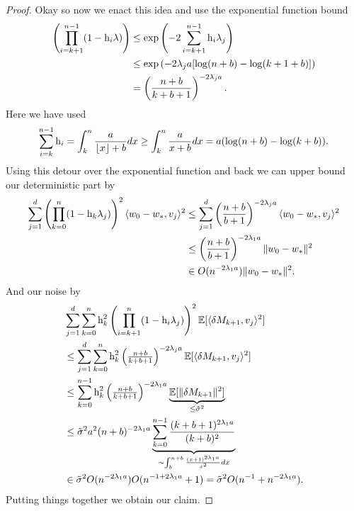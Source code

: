\begin{proof}
	Okay so now we enact this idea and use the exponential function bound
	\begin{align*}
		\left(\prod_{i=k+1}^{n-1}(1-\text{h}_i\lambda)\right)
		&\le\exp\left(-2\sum_{i=k+1}^{n-1}\text{h}_i\lambda_j\right)\\
		&\le \exp\left(-2\lambda_j a[\log(n+b)-\log(k+1+b)]\right)\\
		&= \left(\frac{n+b}{k+b+1}\right)^{-2\lambda_j a}.
	\end{align*}
	Here we have used
	\begin{align*}
		\sum_{i=k}^{n-1} \text{h}_i
		= \int_{k}^{n} \frac{a}{\lfloor x\rfloor+b} dx
		\ge \int_{k}^{n} \frac{a}{x+b} dx
		= a(\log(n+b) - \log(k+b)).
	\end{align*}
	Using this detour over the exponential function and back we can upper bound
	our deterministic part by
	\begin{align}
		\nonumber
		\sum_{j=1}^d\left(\prod_{k=0}^n(1-\text{h}_k\lambda_j)\right)^2
		\langle w_0-w_*, v_j\rangle^2
		&\le \sum_{j=1}^d \left(\frac{n+b}{b+1}\right)^{-2\lambda_j a}
		\langle w_0-w_*, v_j\rangle^2\\
		\label{eq: upper bound on convergence rate using smallest eigenvalue 1}
		&\le \left(\frac{n+b}{b+1}\right)^{-2\lambda_1 a}\|w_0-w_*\|^2\\
		\nonumber
		&\in O(n^{-2\lambda_1a})\|w_0-w_*\|^2.
	\end{align}
	And our noise by
	\begin{align}
		\nonumber
		&\sum_{j=1}^d\sum_{k=0}^n \text{h}_k^2
		\left(\prod_{i=k+1}^n(1-\text{h}_i\lambda_j)\right)^2
		\mathbb{E}[\langle\delta M_{k+1},v_j\rangle^2]\\
		\nonumber
		&\le \sum_{j=1}^d
			\sum_{k=0}^n \text{h}_k^2 \left(\tfrac{n+b}{k+b+1}\right)^{-2\lambda_j a}
			\mathbb{E}[\langle\delta M_{k+1},v_j\rangle^2]
		\\
		\label{eq: upper bound on convergence rate using smallest eigenvalue 2}
		&\le \sum_{k=0}^{n-1} \text{h}_k^2 \left(\tfrac{n+b}{k+b+1}\right)^{-2\lambda_1 a}
		\underbrace{\mathbb{E}[\|\delta M_{k+1}\|^2]}_{\le \tilde{\sigma}^2}
		\\
		\nonumber
		&\le
		\tilde{\sigma}^2a^2 (n+b)^{-2\lambda_1 a}
		\underbrace{\sum_{k=0}^{n-1} \frac{(k+b+1)^{2\lambda_1 a}}{(k+b)^2}}_{
			\sim \int_b^{n+b} \frac{(x+1)^{2\lambda_1 a}}{x^2}dx} \\
		\nonumber
		&\in \tilde{\sigma}^2 O(n^{-2\lambda_1 a})  O(n^{-1+2\lambda_1a} + 1)
		= \tilde{\sigma}^2 O(n^{-1} + n^{-2\lambda_1 a}).
	\end{align}
	Putting things together we obtain our claim.
\end{proof}
